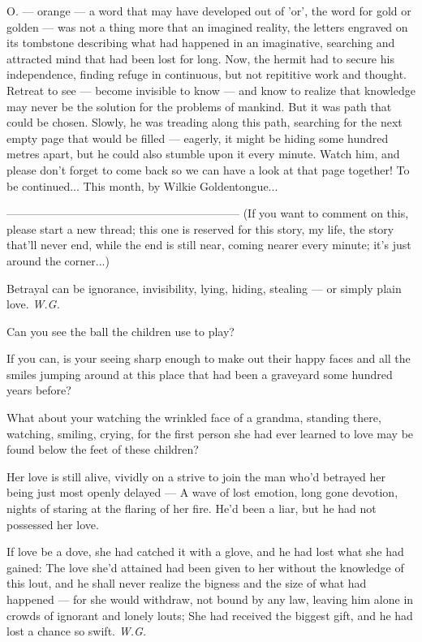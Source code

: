 O. --- orange --- a word that may have developed out of 'or', the word for gold or golden --- was not a thing more that an imagined reality, the letters engraved on its tombstone describing what had happened in an imaginative, searching and attracted mind that had been lost for long. 
Now, the hermit had to secure his independence, finding refuge in continuous, but not repititive work and thought. Retreat to see --- become invisible to know --- and know to realize that knowledge may never be the solution for the problems of mankind. 
But it was path that could be chosen. 
Slowly, he was treading along this path, searching for the next empty page that would be filled --- eagerly, it might be hiding some hundred metres apart, but he could also stumble upon it every minute. 
Watch him, and please don't forget to come back so we can have a look at that page together! 
To be continued...
This month, by Wilkie Goldentongue...

--------------------------------------------------------------
(If you want to comment on this, please start a new thread; this one is reserved for this story, my life, the story that'll never end, while the end is still near, coming nearer every minute; it's just around the corner...)

Betrayal 
can be ignorance, 
invisibility, 
lying, 
hiding, 
stealing --- 
or simply 
plain love. 
\emph{W.G.}

Can you see the ball 
the children use to play? 

If you can, 
is your seeing sharp enough 
to make out their happy faces 
and all the smiles jumping around 
at this place that had been a graveyard 
some hundred years before? 

What about your watching 
the wrinkled face of a grandma, 
standing there, 
watching, 
smiling, 
crying, 
for the first person she had ever learned 
to love 
may be found below the feet of these children? 

Her love is still alive, 
vividly on a strive 
to join the man who'd betrayed 
her being just most openly delayed --- 
A wave of lost emotion, 
long gone devotion, 
nights of staring 
at the flaring 
of her fire. 
He'd been a liar, 
but he had not possessed her love. 

If love be a dove, 
she had catched it with a glove, 
and he had lost what she had gained: 
The love she'd attained 
had been given to her without 
the knowledge of this lout, 
and he shall never realize 
the bigness and the size 
of what had happened --- 
for she would withdraw, 
not bound by any law, 
leaving him alone in crowds 
of ignorant and lonely louts; 
She had received the biggest gift, 
and he had lost a chance so swift. 
\emph{W.G.}

